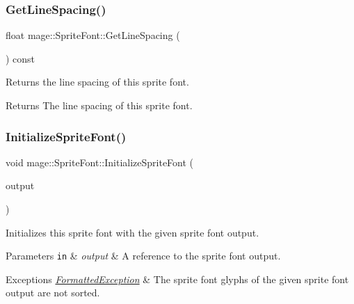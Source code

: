 \subsubsection{\texorpdfstring{Get\+Line\+Spacing()}{GetLineSpacing()}}
{\footnotesize\ttfamily float mage\+::\+Sprite\+Font\+::\+Get\+Line\+Spacing (\begin{DoxyParamCaption}{ }\end{DoxyParamCaption}) const\hspace{0.3cm}{\ttfamily [noexcept]}}

Returns the line spacing of this sprite font.

\begin{DoxyReturn}{Returns}
The line spacing of this sprite font. 
\end{DoxyReturn}
\hypertarget{classmage_1_1_sprite_font_ae0edccbf98f4bd3b3195fa602baee121}{}\label{classmage_1_1_sprite_font_ae0edccbf98f4bd3b3195fa602baee121} 
\subsubsection{\texorpdfstring{Initialize\+Sprite\+Font()}{InitializeSpriteFont()}}
{\footnotesize\ttfamily void mage\+::\+Sprite\+Font\+::\+Initialize\+Sprite\+Font (\begin{DoxyParamCaption}\item[{const \hyperlink{structmage_1_1_sprite_font_output}{Sprite\+Font\+Output} \&}]{output }\end{DoxyParamCaption})\hspace{0.3cm}{\ttfamily [private]}}

Initializes this sprite font with the given sprite font output.


\begin{DoxyParams}[1]{Parameters}
\mbox{\tt in}  & {\em output} & A reference to the sprite font output. \\
\hline
\end{DoxyParams}

\begin{DoxyExceptions}{Exceptions}
{\em \hyperlink{structmage_1_1_formatted_exception}{Formatted\+Exception}} & The sprite font glyphs of the given sprite font output are not sorted. \\
\hline
\end{DoxyExceptions}
\hypertarget{classmage_1_1_sprite_font_a80e5f0cdbb424754a0fb8239103d0f26}{}\label{classmage_1_1_sprite_font_a80e5f0cdbb424754a0fb8239103d0f26} 

